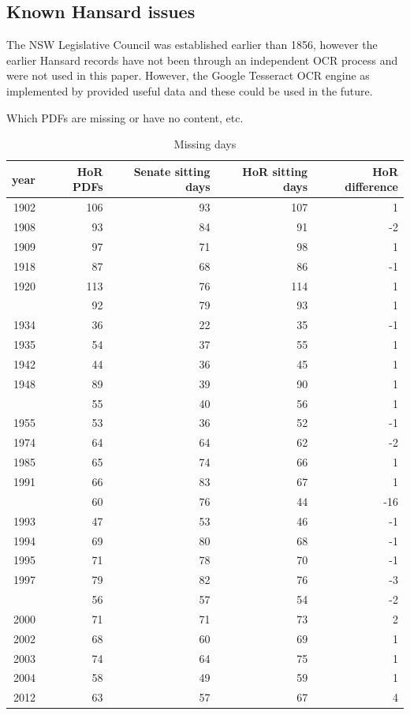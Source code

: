 \documentclass[12pt,]{article}
\theoremstyle{definition}
\theoremstyle{definition}
\theoremstyle{definition}
\theoremstyle{remark}
\begin{document}
\subsection{Known Hansard issues}\label{knownhansardissues}

The NSW Legislative Council was established earlier than 1856, however
the earlier Hansard records have not been through an independent OCR
process and were not used in this paper. However, the Google Tesseract
OCR engine as implemented by \citet{Ooms2018tesseract} provided useful
data and these could be used in the future.

Which PDFs are missing or have no content, etc.

\begin{table}

\caption{\label{tab:missingdays}Missing days}
\centering
\fontsize{8}{10}\selectfont
\begin{tabular}[t]{rrrrr}
\toprule
year & HoR PDFs                      & Senate sitting days           & HoR sitting days              & HoR difference\\
\midrule
1902 & 106 & 93 & 107 & 1\\
1908 & 93 & 84 & 91 & -2\\
1909 & 97 & 71 & 98 & 1\\
1918 & 87 & 68 & 86 & -1\\
1920 & 113 & 76 & 114 & 1\\
\addlinespace
1921 & 92 & 79 & 93 & 1\\
1934 & 36 & 22 & 35 & -1\\
1935 & 54 & 37 & 55 & 1\\
1942 & 44 & 36 & 45 & 1\\
1948 & 89 & 39 & 90 & 1\\
\addlinespace
1951 & 55 & 40 & 56 & 1\\
1955 & 53 & 36 & 52 & -1\\
1974 & 64 & 64 & 62 & -2\\
1985 & 65 & 74 & 66 & 1\\
1991 & 66 & 83 & 67 & 1\\
\addlinespace
1992 & 60 & 76 & 44 & -16\\
1993 & 47 & 53 & 46 & -1\\
1994 & 69 & 80 & 68 & -1\\
1995 & 71 & 78 & 70 & -1\\
1997 & 79 & 82 & 76 & -3\\
\addlinespace
1998 & 56 & 57 & 54 & -2\\
2000 & 71 & 71 & 73 & 2\\
2002 & 68 & 60 & 69 & 1\\
2003 & 74 & 64 & 75 & 1\\
2004 & 58 & 49 & 59 & 1\\
2012 & 63 & 57 & 67 & 4\\
\bottomrule
\end{tabular}
\end{table}
\end{document}
